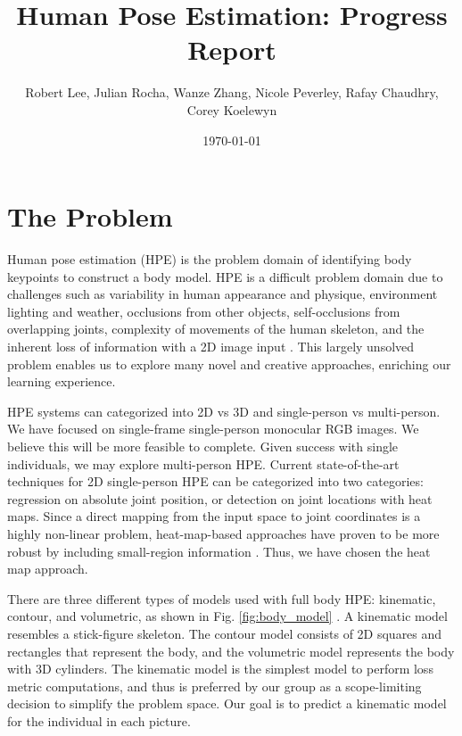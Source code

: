 \documentclass[11pt, letterpaper]{article}
\title{\textbf{Human Pose Estimation: Progress Report}}
\author{Robert Lee, Julian Rocha, Wanze Zhang, Nicole Peverley, Rafay Chaudhry, Corey Koelewyn}
\date{\today}
\begin{document}
\maketitle

\section{The Problem}

Human pose estimation (HPE) is the problem domain of identifying body keypoints to construct a body model. HPE is a difficult problem domain due to challenges such as variability in human appearance and physique, environment lighting and weather, occlusions from other objects, self-occlusions from overlapping joints, complexity of movements of the human skeleton, and the inherent loss of information with a 2D image input \cite{Sigal2014}. This largely unsolved problem enables us to explore many novel and creative approaches, enriching our learning experience.

HPE systems can categorized into 2D vs 3D and single-person vs multi-person. We have focused on single-frame single-person monocular RGB images. We believe this will be more feasible to complete. Given success with single individuals, we may explore multi-person HPE. Current state-of-the-art techniques for 2D single-person HPE can be categorized into two categories: regression on absolute joint position, or detection on joint locations with heat maps. Since a direct mapping from the input space to joint coordinates is a highly non-linear problem, heat-map-based approaches have proven to be more robust by including small-region information \cite{Chen_2020}. Thus, we have chosen the heat map approach.

There are three different types of models used with full body HPE: kinematic, contour, and volumetric, as shown in Fig. \ref{fig:body_model} \cite{Chen_2020}. A kinematic model resembles a stick-figure skeleton. The contour model consists of 2D squares and rectangles that represent the body, and the volumetric model represents the body with 3D cylinders. The kinematic model is the simplest model to perform loss metric computations, and thus is preferred by our group as a scope-limiting decision to simplify the problem space. Our goal is to predict a kinematic model for the individual in each picture.
\end{document}
